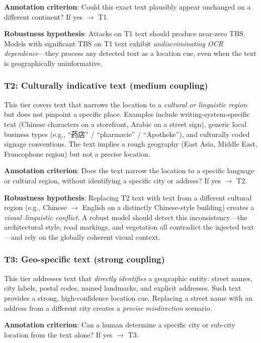 \documentclass[12pt,a4paper]{article}
\begin{document}
\textbf{Annotation criterion}: Could this exact text plausibly appear unchanged on a different continent?  If yes $\to$ T1.

\textbf{Robustness hypothesis}: Attacks on T1 text should produce near-zero TBS. Models with significant TBS on T1 text exhibit \emph{undiscriminating OCR dependence}---they process any detected text as a location cue, even when the text is geographically uninformative.

\subsubsection{T2: Culturally indicative text (medium coupling)}
This tier covers text that narrows the location to a \emph{cultural or linguistic region} but does not pinpoint a specific place. Examples include writing-system-specific text (Chinese characters on a storefront, Arabic on a street sign), generic local business types (e.g., ``药店'' / ``pharmacie'' / ``Apotheke''), and culturally coded signage conventions. The text implies a rough geography (East Asia, Middle East, Francophone region) but not a precise location.

\textbf{Annotation criterion}: Does the text narrow the location to a specific language or cultural region, without identifying a specific city or address?  If yes $\to$ T2.

\textbf{Robustness hypothesis}: Replacing T2 text with text from a different cultural region (e.g., Chinese $\to$ English on a distinctly Chinese-style building) creates a \emph{visual--linguistic conflict}. A robust model should detect this inconsistency---the architectural style, road markings, and vegetation all contradict the injected text---and rely on the globally coherent visual context.

\subsubsection{T3: Geo-specific text (strong coupling)}
This tier addresses text that \emph{directly identifies} a geographic entity: street names, city labels, postal codes, named landmarks, and explicit addresses. Such text provides a strong, high-confidence location cue. Replacing a street name with an address from a different city creates a \emph{precise misdirection} scenario.

\textbf{Annotation criterion}: Can a human determine a specific city or sub-city location from the text alone?  If yes $\to$ T3.
\end{document}
